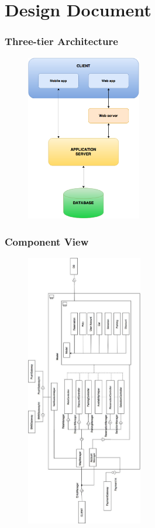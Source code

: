 \section{Design Document}

\begin{frame}
	\frametitle{Three-tier Architecture}
	\begin{figure}[H]
		\centering
		\includegraphics[height=7.3cm,keepaspectratio]{figures/layers.eps}
		\label{fig:layers}
	\end{figure}
\end{frame}

\begin{frame}
	\frametitle{Component View}
	\begin{figure}[H]
		\vspace*{-0.5cm}
		\centering
		\includegraphics[height=12cm,keepaspectratio,angle=270]{figures/component_view.eps}
		\label{fig:component_view}
	\end{figure}
\end{frame}


